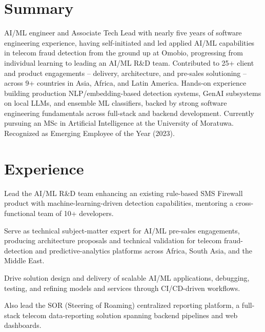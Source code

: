 \documentclass[10.5pt]{article}
\begin{document}

\section*{Summary}
AI/ML engineer and Associate Tech Lead with nearly five years of software engineering experience, having self-initiated and led applied AI/ML capabilities in telecom fraud detection from the ground up at Omobio, progressing from individual learning to leading an AI/ML R\&D team. Contributed to 25+ client and product engagements -- delivery, architecture, and pre-sales solutioning -- across 9+ countries in Asia, Africa, and Latin America. Hands-on experience building production NLP/embedding-based detection systems, GenAI subsystems on local LLMs, and ensemble ML classifiers, backed by strong software engineering fundamentals across full-stack and backend development. Currently pursuing an MSc in Artificial Intelligence at the University of Moratuwa. Recognized as Emerging Employee of the Year (2023).

\section*{Experience}

\begin{cvitems}
  \item Lead the AI/ML R\&D team enhancing an existing rule-based SMS Firewall product with machine-learning-driven detection capabilities, mentoring a cross-functional team of 10+ developers.
  \item Serve as technical subject-matter expert for AI/ML pre-sales engagements, producing architecture proposals and technical validation for telecom fraud-detection and predictive-analytics platforms across Africa, South Asia, and the Middle East.
  \item Drive solution design and delivery of scalable AI/ML applications, debugging, testing, and refining models and services through CI/CD-driven workflows.
  \item Also lead the SOR (Steering of Roaming) centralized reporting platform, a full-stack telecom data-reporting solution spanning backend pipelines and web dashboards.
\end{cvitems}
\end{document}
